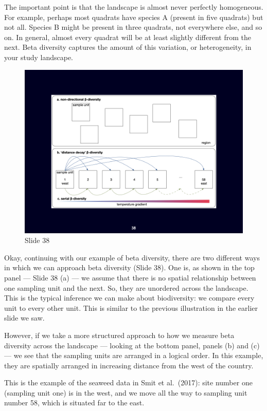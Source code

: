 \documentclass[
  11pt,
]{book}
\begin{document}
The important point is that the landscape is almost never perfectly
homogeneous. For example, perhaps most quadrats have species A (present
in five quadrats) but not all. Species B might be present in three
quadrats, not everywhere else, and so on. In general, almost every
quadrat will be at least slightly different from the next. Beta
diversity captures the amount of this variation, or heterogeneity, in
your study landscape.

\begin{figure}[ht]
\centering
\includegraphics[width=0.8\linewidth]{../images/BDC334/BDC334-038.jpeg}
\caption*{Slide 38}
\end{figure}

Okay, continuing with our example of beta diversity, there are two
different ways in which we can approach beta diversity (Slide 38). One
is, as shown in the top panel --- Slide 38 (a) --- we assume that there
is no spatial relationship between one sampling unit and the next. So,
they are unordered across the landscape. This is the typical inference
we can make about biodiversity: we compare every unit to every other
unit. This is similar to the previous illustration in the earlier slide
we saw.

However, if we take a more structured approach to how we measure beta
diversity across the landscape --- looking at the bottom panel, panels
(b) and (c) --- we see that the sampling units are arranged in a logical
order. In this example, they are spatially arranged in increasing
distance from the west of the country.

This is the example of the seaweed data in Smit et al.~(2017): site
number one (sampling unit one) is in the west, and we move all the way
to sampling unit number 58, which is situated far to the east.
\end{document}
